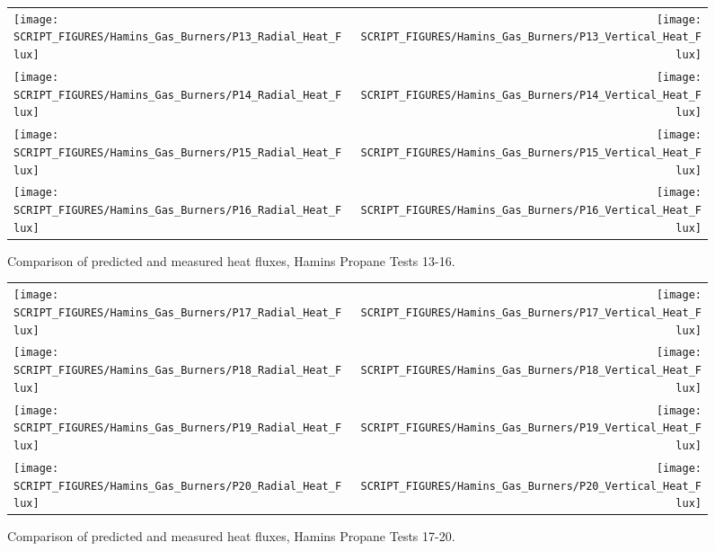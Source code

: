 \begin{figure}[p]
\begin{tabular*}{\textwidth}{l@{\extracolsep{\fill}}r}
\texttt{[image: SCRIPT\_FIGURES/Hamins\_Gas\_Burners/P13\_Radial\_Heat\_Flux]} &
\texttt{[image: SCRIPT\_FIGURES/Hamins\_Gas\_Burners/P13\_Vertical\_Heat\_Flux]} \\
\texttt{[image: SCRIPT\_FIGURES/Hamins\_Gas\_Burners/P14\_Radial\_Heat\_Flux]} &
\texttt{[image: SCRIPT\_FIGURES/Hamins\_Gas\_Burners/P14\_Vertical\_Heat\_Flux]} \\
\texttt{[image: SCRIPT\_FIGURES/Hamins\_Gas\_Burners/P15\_Radial\_Heat\_Flux]} &
\texttt{[image: SCRIPT\_FIGURES/Hamins\_Gas\_Burners/P15\_Vertical\_Heat\_Flux]} \\
\texttt{[image: SCRIPT\_FIGURES/Hamins\_Gas\_Burners/P16\_Radial\_Heat\_Flux]} &
\texttt{[image: SCRIPT\_FIGURES/Hamins\_Gas\_Burners/P16\_Vertical\_Heat\_Flux]}
\end{tabular*}
\label{Hamins_Propane_13-16}
\caption[Heat flux predictions, Hamins propane burner Tests 13-16]
{Comparison of predicted and measured heat fluxes, Hamins Propane Tests 13-16.}
\end{figure}

\begin{figure}[p]
\begin{tabular*}{\textwidth}{l@{\extracolsep{\fill}}r}
\texttt{[image: SCRIPT\_FIGURES/Hamins\_Gas\_Burners/P17\_Radial\_Heat\_Flux]} &
\texttt{[image: SCRIPT\_FIGURES/Hamins\_Gas\_Burners/P17\_Vertical\_Heat\_Flux]} \\
\texttt{[image: SCRIPT\_FIGURES/Hamins\_Gas\_Burners/P18\_Radial\_Heat\_Flux]} &
\texttt{[image: SCRIPT\_FIGURES/Hamins\_Gas\_Burners/P18\_Vertical\_Heat\_Flux]} \\
\texttt{[image: SCRIPT\_FIGURES/Hamins\_Gas\_Burners/P19\_Radial\_Heat\_Flux]} &
\texttt{[image: SCRIPT\_FIGURES/Hamins\_Gas\_Burners/P19\_Vertical\_Heat\_Flux]} \\
\texttt{[image: SCRIPT\_FIGURES/Hamins\_Gas\_Burners/P20\_Radial\_Heat\_Flux]} &
\texttt{[image: SCRIPT\_FIGURES/Hamins\_Gas\_Burners/P20\_Vertical\_Heat\_Flux]}
\end{tabular*}
\label{Hamins_Propane_17-20}
\caption[Heat flux predictions, Hamins propane burner Tests 17-20]
{Comparison of predicted and measured heat fluxes, Hamins Propane Tests 17-20.}
\end{figure}

